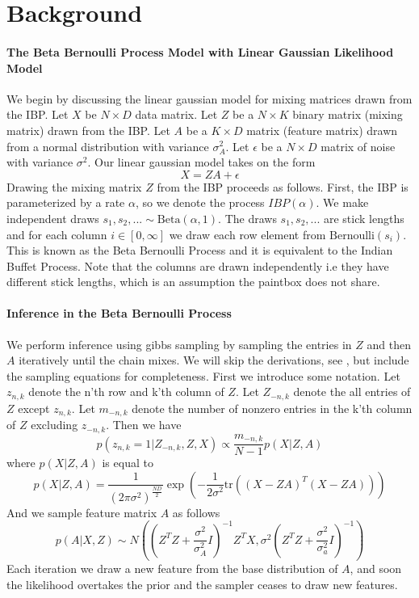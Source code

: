 \documentclass{article}
\begin{document}
\section{Background}
\paragraph{The Beta Bernoulli Process Model with Linear Gaussian Likelihood Model}

We begin by discussing the linear gaussian model for mixing matrices drawn from the IBP.  Let $X$ be $N \times D$ data matrix.  Let $Z$ be a $N \times K$ binary matrix (mixing matrix) drawn from the IBP.  Let $A$ be a $K \times D$ matrix (feature matrix) drawn from a normal distribution with variance $\sigma_A^2$.  Let $\epsilon$ be a $N \times D$ matrix of noise with variance $\sigma^2$. Our linear gaussian model takes on the form 
\begin{equation}
X = ZA + \epsilon
\end{equation}
Drawing the mixing matrix $Z$ from the IBP proceeds as follows.  First, the IBP is parameterized by a rate $\alpha$, so we denote the process $IBP(\alpha)$.  We make independent draws $s_1,s_2,... \sim \text{Beta}(\alpha,1)$.  The draws $s_1,s_2,...$ are stick lengths and for each column $i \in [0,\infty]$ we draw each row element from $\text{Bernoulli}(s_i)$.  This is known as the Beta Bernoulli Process and it is equivalent to the Indian Buffet Process.  Note that the columns are drawn independently i.e they have different stick lengths, which is an assumption the paintbox does not share.    

\paragraph{Inference in the Beta Bernoulli Process}
We perform inference using gibbs sampling by sampling the entries in $Z$ and then $A$ iteratively until the chain mixes.  We will skip the derivations, see \cite{gg11}, but include the sampling equations for completeness.  First we introduce some notation.  Let $z_{n,k}$ denote the n'th row and k'th column of $Z$.  Let $Z_{-n,k}$ denote the all entries of $Z$ except $z_{n,k}$.  Let $m_{-n,k}$ denote the number of nonzero entries in the k'th column of $Z$ excluding $z_{-n,k}$.  Then we have
\begin{equation}
p(z_{n,k}=1|Z_{-n,k},Z,X) \propto \frac{m_{-n,k}}{N-1} p(X|Z,A)
\end{equation}
where $p(X|Z,A)$ is equal to
\begin{equation}
p(X|Z,A) = \frac{1}{(2\pi\sigma^2)^\frac{ND}{2}} \exp(-\frac{1}{2\sigma^2} \text{tr}((X-ZA)^T(X-ZA)))
\end{equation}
And we sample feature matrix $A$ as follows
\begin{equation}
p(A|X,Z) \sim N((Z^TZ + \frac{\sigma^2}{\sigma_A^2}I)^{-1}Z^TX,\sigma^2(Z^TZ + \frac{\sigma^2}{\sigma_a^2}I)^{-1})
\end{equation}
Each iteration we draw a new feature from the base distribution of $A$, and soon the likelihood overtakes the prior and the sampler ceases to draw new features.   
\end{document}
